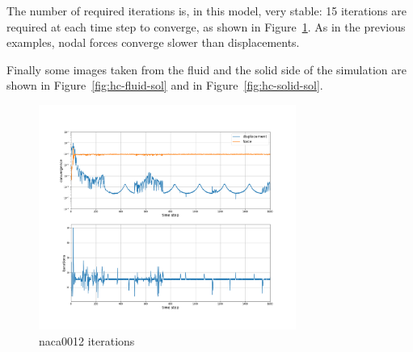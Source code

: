 The number of required iterations is, in this model, very stable: 15 iterations are required at each time step to converge, as shown in Figure~\ref{fig:hc-iterations}. As in the previous examples, nodal forces converge slower than displacements.

Finally some images taken from the fluid and the solid side of the simulation are shown in Figure~\ref{fig:hc-fluid-sol} and in Figure~\ref{fig:hc-solid-sol}.

\begin{figure}[htbp!]
	\centering
	\includegraphics[width=0.75\textwidth, trim=0 80 0 100, clip]{images/heathcote/naca0012_iterations.png}
	\caption{naca0012 iterations}
	\label{fig:hc-iterations}
\end{figure}


